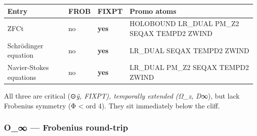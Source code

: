 {\def\LTcaptype{none} %
\begin{longtable}[]{@{}
  >{\raggedright\arraybackslash}p{}
  >{\raggedright\arraybackslash}p{}
  >{\raggedright\arraybackslash}p{}
  >{\raggedright\arraybackslash}p{}@{}}
\toprule\noalign{}
\begin{minipage}[b]{\linewidth}\raggedright
Entry
\end{minipage} & \begin{minipage}[b]{\linewidth}\raggedright
FROB
\end{minipage} & \begin{minipage}[b]{\linewidth}\raggedright
FIXPT
\end{minipage} & \begin{minipage}[b]{\linewidth}\raggedright
Promo atoms
\end{minipage} \\
\midrule\noalign{}
\endhead
\bottomrule\noalign{}
\endlastfoot
ZFCt & no & \textbf{yes} & HOLOBOUND LR\_DUAL PM\_Z2 SEQAX TEMPD2
ZWIND \\
Schrödinger equation & no & \textbf{yes} & LR\_DUAL SEQAX TEMPD2
ZWIND \\
Navier-Stokes equations & no & \textbf{yes} & LR\_DUAL PM\_Z2 SEQAX
TEMPD2 ZWIND \\
\end{longtable}
}

All three are critical (⊙\emph{ÿ, FIXPT), temporally extended (Ω\_z,
D}∞), but lack Frobenius symmetry (Φ \textless{} ord 4). They sit
immediately below the cliff.

\subsubsection{O\_∞ --- Frobenius
round-trip}\label{o_-frobenius-round-trip}

